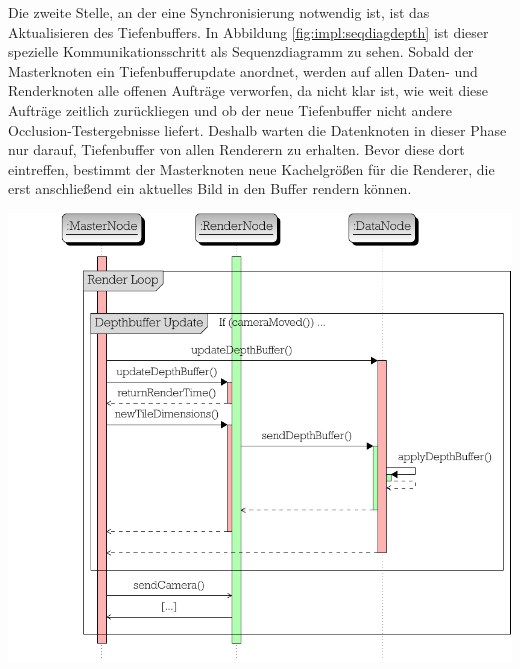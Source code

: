 Die zweite Stelle, an der eine Synchronisierung notwendig ist, ist das Aktualisieren des Tiefenbuffers. In Abbildung \ref{fig:impl:seqdiagdepth} ist dieser spezielle Kommunikationsschritt als Sequenzdiagramm zu sehen. Sobald der Masterknoten ein Tiefenbufferupdate anordnet, werden auf allen Daten- und Renderknoten alle offenen Aufträge verworfen, da nicht klar ist, wie weit diese Aufträge zeitlich zurückliegen und ob der neue Tiefenbuffer nicht andere Occlusion-Testergebnisse liefert. Deshalb warten die Datenknoten in dieser Phase nur darauf, Tiefenbuffer von allen Renderern zu erhalten. Bevor diese dort eintreffen, bestimmt der Masterknoten neue Kachelgrößen für die Renderer, die erst anschließend ein aktuelles Bild in den Buffer rendern können.\\

\begin{Bild}
\includegraphics[scale=0.85]{images/seq_diag_depth.pdf}
\end{Bild}

%
%
